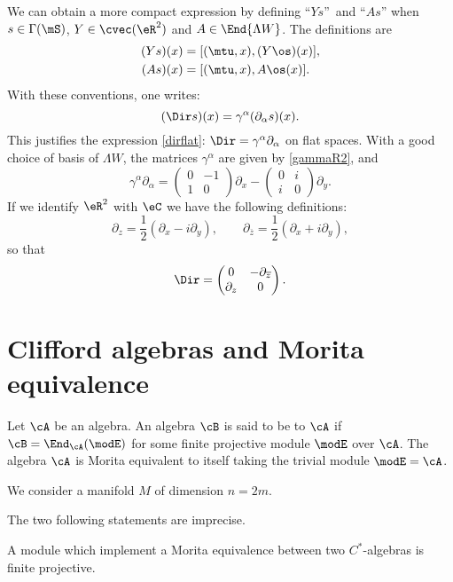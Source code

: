 We can obtain a more compact expression by defining ``$Ys$''\ and ``$As$'' when $s\in\Gamma(\mS)$, $Y\in\cvec(\eR^2)$ and $A\in\End{\Lambda W }$. The definitions are
\begin{align*}
(Ys)(x)&=[(\mtu,x),(Y\os)(x)],\\
(As)(x)&=[(\mtu,x),A\os(x)].
\end{align*}
With these conventions, one writes:
\[
(\Dir s)(x)=\gamma^{\alpha}(\partial_{\alpha} s)(x).
\]
This justifies the expression \eqref{dirflat}: $\Dir=\gamma^{\alpha}\partial_{\alpha}$ on flat spaces. With a good choice of basis of $\Lambda W $, the matrices $\gamma^{\alpha}$ are given by \eqref{gammaR2}, and
\[
\gamma^{\alpha}\partial_{\alpha}=
\begin{pmatrix}
0 & -1 \\
1 & 0
\end{pmatrix}\partial_x-
\begin{pmatrix}
0 & i \\
i & 0
\end{pmatrix}\partial_y.
\] 
If we identify $\eR^2$ with $\eC$ we have the following definitions:
\[
\partial_z=\frac{1}{2}(\partial_x-i\partial_y),\qquad\partial_{\overline{z}}=\frac{1}{2}(\partial_x+i\partial_y),\]
so that
\[\Dir=\begin{pmatrix}
0 & -\partial_{\overline{z}} \\
\partial_z & 0
\end{pmatrix}.
\]
\section{Clifford algebras and Morita equivalence}

Let $\cA$ be an algebra. An algebra $\cB$ is said to be \label{PgMoritaEq} to $\cA$ if $\cB=\End_{\cA}(\modE)$ for some finite projective module $\modE$ over $\cA$. The algebra $\cA$ is Morita equivalent to itself taking the trivial module $\modE=\cA$.

We consider a manifold $M$ of dimension $n=2m$.

\begin{probleme}
	The two following statements are imprecise.
\end{probleme}

\begin{proposition}
A module which implement a Morita equivalence between two $C^*$-algebras is finite projective.
\end{proposition}


